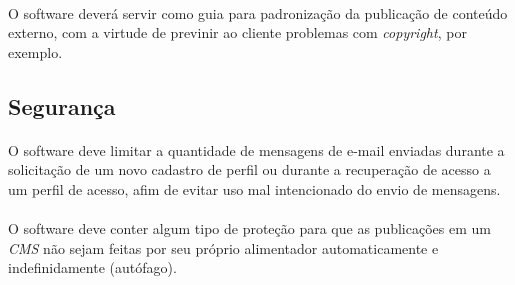 \documentclass[a4paper,12pt]{article}
\def\cms{\emph{CMS}}
\begin{document}
\paragraph{}
O software deverá servir como guia para padronização da publicação de conteúdo
externo, com a virtude de previnir ao cliente problemas com \emph{copyright},
por exemplo.

\subsection{Segurança}

\paragraph{}
O software deve limitar a quantidade de mensagens de e-mail enviadas durante a
solicitação de um novo cadastro de perfil ou durante a recuperação de acesso a
um perfil de acesso, afim de evitar uso mal intencionado do envio de mensagens.

\paragraph{}
O software deve conter algum tipo de proteção para que as publicações em um
\cms{} não sejam feitas por seu próprio alimentador automaticamente e
indefinidamente (autófago).
\end{document}
